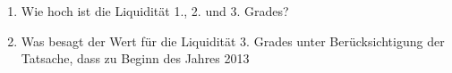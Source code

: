 \documentclass[12pt,a4paper]{scrreprt}
\begin{document}
\begin{enumerate}
\begin{enumerate}
\item Wie hoch ist die Liquidität 1., 2. und 3. Grades?
\item Was besagt der Wert für die Liquidität 3. Grades unter Berücksichtigung der Tatsache, dass zu
Beginn des Jahres 2013

\end{enumerate}


\end{enumerate}
\end{document}
